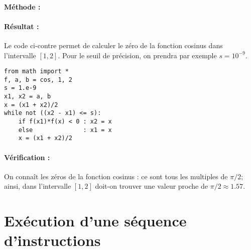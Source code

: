 \documentclass[11pt,a4paper]{article}
\begin{document}
\paragraph{Méthode :}

\paragraph{Résultat :}\mbox{}

\noindent\begin{minipage}{7cm}
Le code \python{} ci-contre permet de calculer le zéro de la fonction cosinus
dans l'intervalle $[1,2]$.
Pour le seuil de précision, on prendra par exemple
$s = 10^{-9}$.
\end{minipage}
\hfill
\begin{minipage}{8cm}\footnotesize
\begin{lstlisting}[caption=\textbf{zéro d'une fonction}]
from math import *
f, a, b = cos, 1, 2
s = 1.e-9
x1, x2 = a, b
x = (x1 + x2)/2
while not ((x2 - x1) <= s):
    if f(x1)*f(x) < 0 : x2 = x
    else              : x1 = x
    x = (x1 + x2)/2
\end{lstlisting}
\end{minipage}
    
\paragraph{Vérification :}
On connaît les zéros de la fonction cosinus : ce sont
tous les multiples de $\pi/2$;
ainsi, dans l'intervalle $[1,2]$ doit-on trouver une valeur proche de
$\pi/2 \approx 1.57$.


\section{Exécution d'une séquence d'instructions}
\end{document}
